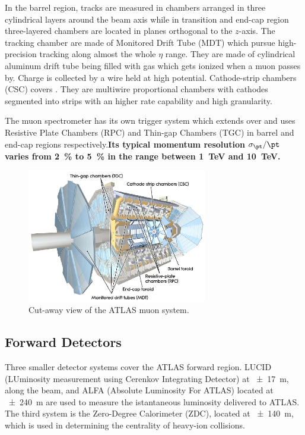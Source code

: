 In the barrel region, tracks are measured in chambers arranged in three cylindrical layers around the beam axis while in transition and end-cap region three-layered chambers are located in planes orthogonal to the $z$-axis. The tracking chamber are made of Monitored Drift Tube (MDT) which pursue high-precision tracking along almost the whole $\eta$ range. They are made of cylindrical aluminum drift tube being filled with gas which gets ionized when a muon passes by. Charge is collected by a wire held at high potential. Cathode-strip chambers (CSC) covers . They are multiwire proportional chambers with cathodes segmented into strips with an higher rate capability and high granularity.     

The muon spectrometer has its own trigger system which extends over  and uses Resistive Plate Chambers (RPC) and Thin-gap Chambers (TGC) in barrel and end-cap regions respectively.{\bfseries Its typical momentum resolution $\sigma_{\pt}/\pt$ varies from \SI{2}{\percent} to \SI{5}{\percent} in the range between \SI{1}{\TeV} and \SI{10}{\TeV}.}

\begin{figure}[pt]
\centering
\includegraphics[width=0.7\textwidth]{LHC_ATLAS/Muons}
\caption{Cut-away view of the ATLAS muon system.}
\label{fig:muons}
\end{figure}

\subsection{Forward Detectors}
Three smaller detector systems cover the ATLAS forward region. LUCID (LUminosity measurement using Cerenkov Integrating Detector) at \SI{\pm 17}{\m}, along the beam, and ALFA (Absolute Luminosity For ATLAS) located at \SI{\pm 240}{\m} are used to measure the istantaneous luminosity delivered to ATLAS. The third system is the Zero-Degree Calorimeter (ZDC), located at \SI{\pm 140}{\m}, which is used in determining the centrality of heavy-ion collisions.

